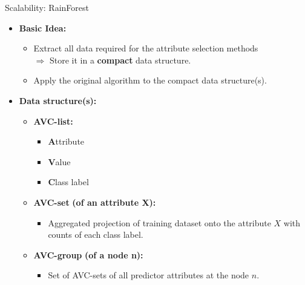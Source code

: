 \begin{frame}{Scalability: RainForest}
	\begin{itemize}
		\item \textbf{Basic Idea:}
		      \begin{itemize}
			      \item Extract all data required for the attribute selection methods \\
			            $\Rightarrow$ Store it in a \textbf{compact} data structure.
			      \item Apply the original algorithm to the compact data structure(s).
		      \end{itemize}
		\item \textbf{Data structure(s):}
		      \begin{itemize}
			      \item \textbf{\color{airforceblue}AVC-list:}
			            \begin{itemize}
				            \item \textbf{\color{airforceblue}A}ttribute
				            \item \textbf{\color{airforceblue}V}alue
				            \item \textbf{\color{airforceblue}C}lass label
			            \end{itemize}
			      \item \textbf{\color{airforceblue}AVC-set} \textbf{(of an attribute X):}
			            \begin{itemize}
				            \item Aggregated projection of training dataset onto the attribute $X$ with counts of each class label.
			            \end{itemize}
			      \item \textbf{\color{airforceblue}AVC-group} \textbf{(of a node n):}
			            \begin{itemize}
				            \item Set of AVC-sets of all predictor attributes at the node $n$.
			            \end{itemize}
		      \end{itemize}

	\end{itemize}
\end{frame}


